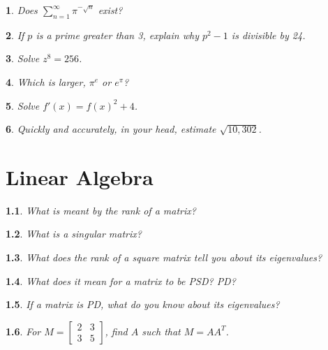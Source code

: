 \documentclass{report}
\newtheorem{problem}{}
\numberwithin{problem}{chapter} %
\newcommand{\ds}{\displaystyle}
\begin{document}
\begin{problem}
Does $\ds \sum_{n=1}^\infty \pi^{-\sqrt{n}}$ exist?
\end{problem}

\begin{problem}
\cite{CRACK}
If $p$ is a prime greater than 3, explain why $p^2-1$ is divisible by 24. 
\end{problem}

\begin{problem}
Solve $z^8=256$.
\end{problem}

\begin{problem}
\cite{STRAWA}
Which is larger, $\pi^e$ or $e^\pi$?
\end{problem}

\begin{problem}
Solve $f'(x)=f(x)^2+4$.
\end{problem}

\begin{problem}
Quickly and accurately, in your head, estimate $\sqrt{10,302}$.
\end{problem}

\chapter{Linear Algebra}

\begin{problem}
What is meant by the {\it rank} of a matrix? 
\end{problem}

\begin{problem}
What is a  {\it singular} matrix? 
\end{problem}

\begin{problem}
What does the rank of a square matrix tell you about its eigenvalues?
\end{problem}

\begin{problem}
What does it mean for a matrix to be PSD? PD?
\end{problem}

\begin{problem}
If a matrix is PD, what do you know about its eigenvalues?
\end{problem}

\begin{problem}
For $M =\begin{bmatrix}
    2  & 3 \\
    3  & 5
\end{bmatrix}$, find $A$ such that $M=AA^{T}$.
\end{problem}
\end{document}
